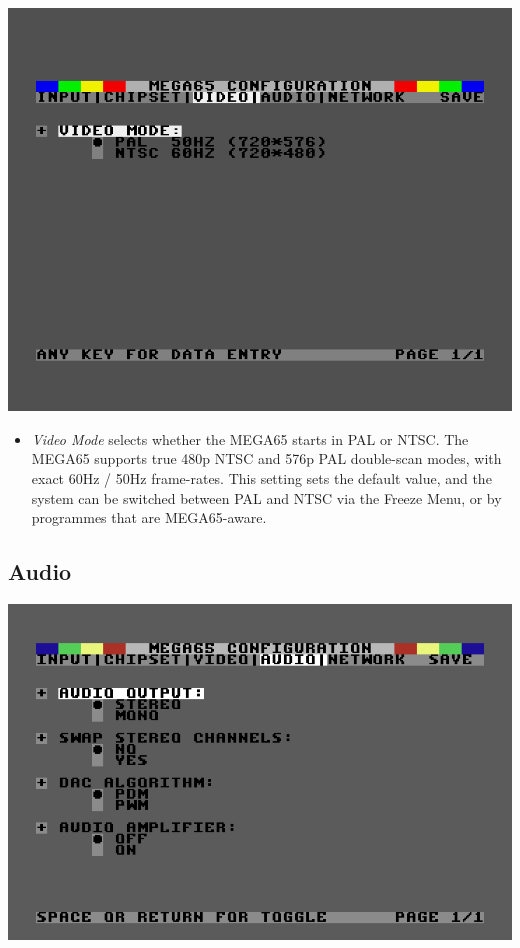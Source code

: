 \includegraphics[width=\linewidth]{images/ss-m65config-3.png}

\begin{itemize}
  \item{\em Video Mode} selects whether the MEGA65 starts in PAL or NTSC.
    The MEGA65 supports true 480p NTSC and 576p PAL double-scan modes,
    with exact 60Hz / 50Hz frame-rates.  This setting sets the
    default value, and the system can be switched between PAL and NTSC
    via the Freeze Menu, or by programmes that are MEGA65-aware.
\end{itemize}

\subsection{Audio}

\includegraphics[width=\linewidth]{images/ss-m65config-4.png}

